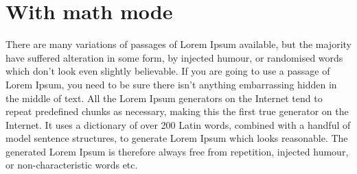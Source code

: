 \documentclass{ximera}
\begin{document}
\begin{center}
\end{center}


\section{With math mode}


There are many variations of passages of Lorem Ipsum available, but
the majority have suffered alteration in some form, by injected
humour, or randomised words which don't look even slightly
believable. If you are going to use a passage of Lorem Ipsum, you need
to be sure there isn't anything embarrassing hidden in the middle of
text. All the Lorem Ipsum generators on the Internet tend to repeat
predefined chunks as necessary, making this the first true generator
on the Internet. It uses a dictionary of over 200 Latin words,
combined with a handful of model sentence structures, to generate
Lorem Ipsum which looks reasonable. The generated Lorem Ipsum is
therefore always free from repetition, injected humour, or
non-characteristic words etc.
\end{document}

